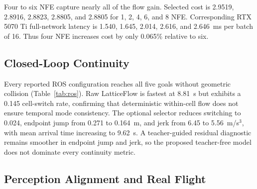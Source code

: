 Four to six NFE capture nearly all of the flow gain. Selected cost is 2.9519, 2.8916, 2.8823, 2.8805, and 2.8805 for 1, 2, 4, 6, and 8 NFE. Corresponding RTX 5070 Ti full-network latency is 1.540, 1.645, 2.014, 2.616, and 2.646~ms per batch of 16. Thus four NFE increases cost by only 0.065\% relative to six.

\subsection{Closed-Loop Continuity}

Every reported ROS configuration reaches all five goals without geometric collision (Table~\ref{tab:ros}). Raw LatticeFlow is fastest at 8.81~s but exhibits a 0.145 cell-switch rate, confirming that deterministic within-cell flow does not ensure temporal mode consistency. The optional selector reduces switching to 0.024, endpoint jump from 0.271 to 0.164~m, and jerk from 6.45 to 5.56~m/s$^3$, with mean arrival time increasing to 9.62~s. A teacher-guided residual diagnostic remains smoother in endpoint jump and jerk, so the proposed teacher-free model does not dominate every continuity metric.

\begin{table}[t]
\caption{Matched ROS trials on one forest, five goals per configuration.}
\label{tab:ros}
\centering
\small
{}
\end{table}

\subsection{Perception Alignment and Real Flight}

